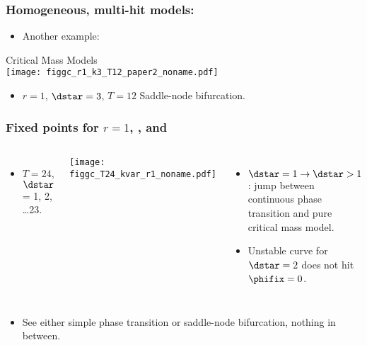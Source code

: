 \begin{frame}
  \frametitle{Homogeneous, multi-hit models:}

  \begin{itemize}
  \item Another example:
  \end{itemize}

  \begin{center}
  Critical Mass Models\\
  \texttt{[image: figgc\_r1\_k3\_T12\_paper2\_noname.pdf]}\\
  \end{center}

  \begin{itemize}
  \item $r=1$, $\dstar=3$, $T=12$ \hfill Saddle-node bifurcation.
  \end{itemize}
  
\end{frame}


\begin{frame}
 \frametitle{Fixed points for $r = 1$, , and }

 \begin{columns}
   \begin{itemize}
   \item<1->
     $T=24$, $\dstar$ = 1, 2, \ldots 23.
   \end{itemize}
   \texttt{[image: figgc\_T24\_kvar\_r1\_noname.pdf]} 
   \begin{itemize}
   \item 
     $\dstar=1 \rightarrow \dstar>1$: 
     jump between continuous phase transition
     and pure critical mass model.
   \item 
     Unstable curve for $\dstar=2$ \alert{does not} hit $\phifix=0$.
   \end{itemize}
 \end{columns}

 \begin{itemize}
 \item<2-> 
   See \alert{either} simple phase transition or saddle-node bifurcation,
   nothing in between.
 \end{itemize}

\end{frame}

